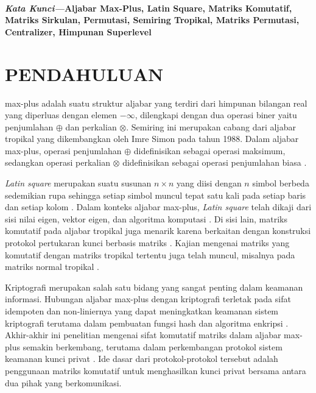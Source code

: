 \documentclass[journal]{IEEEtran}
\theoremstyle{definition}
\theoremstyle{plain}
\newcommand{\katakunci}[1]{%
    \noindent\\
    \textit{\textbf{Kata Kunci---}}{\textbf{#1}}
}
\begin{document}
\katakunci{\small Aljabar Max-Plus, Latin Square, Matriks Komutatif, Matriks Sirkulan, Permutasi, Semiring Tropikal, Matriks Permutasi, Centralizer, Himpunan Superlevel}

\IEEEpeerreviewmaketitle

\section{PENDAHULUAN}
\normalsize {} max-plus adalah suatu struktur aljabar yang terdiri dari himpunan bilangan real yang diperluas dengan elemen $-\infty$, dilengkapi dengan dua operasi biner yaitu penjumlahan $\oplus$ dan perkalian $\otimes$.
Semiring ini merupakan cabang dari aljabar tropikal yang dikembangkan oleh Imre Simon pada tahun 1988.
Dalam aljabar max-plus, operasi penjumlahan $\oplus$ didefinisikan sebagai operasi maksimum, sedangkan operasi perkalian $\otimes$ didefinisikan sebagai operasi penjumlahan biasa \cite{subiono2015minmaxplus}.

\textit{Latin square} merupakan suatu susunan $n\times n$ yang diisi dengan $n$ simbol berbeda sedemikian rupa sehingga setiap simbol muncul tepat satu kali pada setiap baris dan setiap kolom \cite{george2017introductioncombinatorics}.
Dalam konteks aljabar max-plus, \textit{Latin square} telah dikaji dari sisi nilai eigen, vektor eigen, dan algoritma komputasi \cite{mufid2014eigenvalues}.
Di sisi lain, matriks komutatif pada aljabar tropikal juga menarik karena berkaitan dengan konstruksi protokol pertukaran kunci berbasis matriks \cite{alhussaini2024securityinitialtropical,muanalifah2020modifyingtropical,alhussaini2024tropicaltwosided}. Kajian mengenai matriks yang komutatif dengan matriks tropikal tertentu juga telah muncul, misalnya pada matriks normal tropikal \cite{linde2014matricescommutinggivennormal}.

Kriptografi merupakan salah satu bidang yang sangat penting dalam keamanan informasi. Hubungan aljabar max-plus dengan kriptografi terletak pada sifat idempoten dan non-liniernya yang dapat meningkatkan keamanan sistem kriptografi terutama dalam pembuatan fungsi hash dan algoritma enkripsi \cite{durcheva2025cryptographyidempotent}. Akhir-akhir ini penelitian mengenai sifat komutatif matriks dalam aljabar max-plus semakin berkembang, terutama dalam perkembangan protokol sistem keamanan kunci privat \cite{buchinskiy2024analysisfour}. Ide dasar dari protokol-protokol tersebut adalah penggunaan matriks komutatif untuk menghasilkan kunci privat bersama antara dua pihak yang berkomunikasi.
\end{document}
